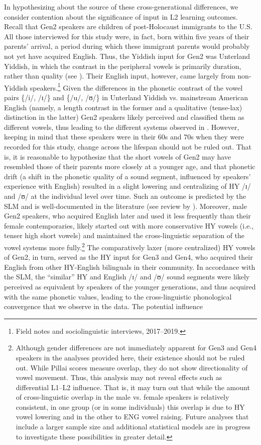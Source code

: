 \documentclass[output=paper]{langsci/langscibook}
\begin{document}
In hypothesizing about the source of these cross-generational differences, we consider  contention about the significance of input in L2 learning outcomes. Recall that Gen2 speakers are children of post-Holocaust immigrants to the U.S. All those interviewed for this study were, in fact, born within five years of their parents’ arrival, a period during which these immigrant parents would probably not yet have acquired English. Thus, the Yiddish input for Gen2 was Unterland Yiddish, in which the contrast in the peripheral vowels is primarily duration, rather than quality (see \citealt{Nove2020}). Their English input, however, came largely from non-Yiddish speakers.\footnote{Field notes and sociolinguistic interviews, 2017--2019.} Given the differences in the phonetic contrast of the vowel pairs \{/i/, /ɪ/\} and \{/u/, /ʊ/\} in Unterland Yiddish vs. mainstream American English (namely, a length contrast in the former and a qualitative (tense-lax) distinction in the latter) Gen2 speakers likely perceived and classified them as different vowels, thus leading to the different systems observed in . However, keeping in mind that these speakers were in their 60s and 70s when they were recorded for this study, change across the lifespan should not be ruled out. That is, it is reasonable to hypothesize that the short vowels of Gen2 may have resembled those of their parents more closely at a younger age, and that phonetic drift (a shift in the phonetic quality of a sound segment, influenced by speakers’ experience with English) resulted in a slight lowering and centralizing of HY /ɪ/ and /ʊ/ at the individual level over time. Such an outcome is predicted by the SLM and is well-documented in the literature (see review by \citealt{Chang2019}). Moreover, male Gen2 speakers, who acquired English later and used it less frequently than their female contemporaries, likely started out with more conservative HY vowels (i.e., tenser high short vowels) and maintained the cross-linguistic separation of the vowel systems more fully.\footnote{Although gender differences are not immediately apparent for Gen3 and Gen4 speakers in the analyses provided here, their existence should not be ruled out. While Pillai scores measure overlap, they do not show directionality of vowel movement. Thus, this analysis may not reveal effects such as differential L1--L2 influence. That is, it may turn out that while the amount of cross-linguistic overlap in the male vs. female speakers is relatively consistent, in one group (or in some individuals) this overlap is due to HY vowel lowering and in the other to ENG vowel raising. Future analyses that include a larger sample size and additional statistical models are in progress to investigate these possibilities in greater detail.} The comparatively laxer (more centralized) HY vowels of Gen2, in turn, served as the HY input for Gen3 and Gen4, who acquired their English from other HY-English bilinguals in their community. In accordance with the SLM, the “similar” HY and English /ɪ/ and /ʊ/ sound segments were likely perceived as equivalent by speakers of the younger generations, and thus acquired with the same phonetic values, leading to the cross-linguistic phonological convergence that we observe in the data. The potential influence 
\end{document}
